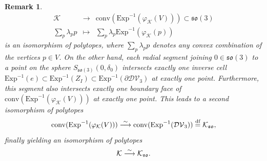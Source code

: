 \documentclass[11pt,twoside]{amsart}
\theoremstyle{plain}
\newtheorem{rem}[prop]{Remark}
\newcommand{\longto}{\longrightarrow}
\begin{document}
\begin{rem}
\[\begin{array}{ccc}\mathcal{K} & \longto & \mathrm{conv}(\mathrm{Exp}^{-1}(\varphi_{\mathcal{K}}(V)))\subset\mathfrak{so}(3) \\\sum_{p}\lambda_pp & \longmapsto & \sum_p\lambda_p\mathrm{Exp}^{-1}(\varphi_{\mathcal{K}}(p))\end{array}\]
is an isomorphism of polytopes, where $\sum_p\lambda_pp$ denotes any convex combination of the vertices $p\in V$. On the other hand, each radial segment joining $0\in\mathfrak{so}(3)$ to a point on the sphere $S_{\mathfrak{so}(3)}(0,\delta_0)$ intersects exactly one inverse cell $\mathrm{Exp}^{-1}(e)\subset\mathrm{Exp}^{-1}(Z_I)\subset \mathrm{Exp}^{-1}(\partial\mathcal{DV}_3)$ at exactly one point. Furthermore, this segment also intersects exactly one boundary face of $\mathrm{conv}(\mathrm{Exp}^{-1}(\varphi_{\mathcal{K}}(V)))$ at exactly one point. This leads to a second isomorphism of polytopes
\[\mathrm{conv}(\mathrm{Exp}^{-1}(\varphi_{\mathcal{K}}(V)))\stackrel{\tiny{\sim}}\longto\mathrm{conv}(\mathrm{Exp}^{-1}(\mathcal{DV}_3))\stackrel{\tiny{\text{df}}}=\mathcal{K}_{\mathfrak{so}},\]
finally yielding an isomorphism of polytopes
\[\mathcal{K}\stackrel{\tiny{\sim}}\longto\mathcal{K}_{\mathfrak{so}}.\]
\end{rem}
\end{document}
